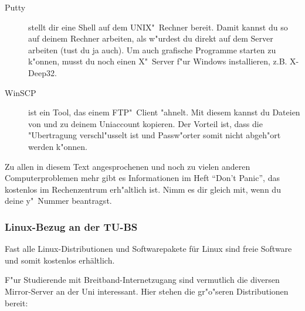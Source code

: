 \begin{description}
\item[Putty] stellt dir eine Shell auf dem UNIX"~Rechner bereit. Damit
kannst du so auf deinem Rechner arbeiten, als w"urdest du direkt auf
dem Server arbeiten (tust du ja auch). Um auch grafische Programme
starten zu k"onnen, musst du noch einen X"~Server f"ur Windows installieren,
z.B. X-Deep32.
\item[WinSCP] ist ein Tool, das einem FTP"~Client "ahnelt. Mit diesem
kannst du Dateien von und zu deinem Uniaccount kopieren. Der Vorteil
ist, dass die "Ubertragung verschl"usselt ist und Passw"orter somit
nicht abgeh"ort werden k"onnen.
\end{description}

Zu allen in diesem Text angesprochenen und noch zu vielen anderen
Computerproblemen mehr gibt es Informationen im Heft "`Don't Panic"',
das kostenlos im Rechenzentrum erh"altlich ist. Nimm es dir gleich mit, wenn
du deine y"~Nummer beantragst.

\subsubsection{Linux-Bezug an der TU-BS}
Fast alle Linux-Distributionen und Softwarepakete für Linux sind freie
Software und somit kostenlos erhältlich.

F"ur Studierende mit Breitband-Internetzugang sind vermutlich die diversen 
Mirror-Server an der Uni interessant. Hier stehen die gr"o"seren 
Distributionen bereit:
	  
